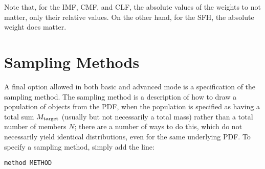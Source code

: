 \documentclass[letterpaper,10pt,english]{sphinxmanual}
\begin{document}
Note that, for the IMF, CMF, and CLF, the absolute values of the weights to not matter, only their relative values. On the other hand, for the SFH, the absolute weight does matter.


\section{Sampling Methods}
\label{pdfs:sampling-methods}\label{pdfs:sampling-metod-label}
A final option allowed in both basic and advanced mode is a specification of the sampling method. The sampling method is a description of how to draw a population of objects from the PDF, when the population is specified as having a total sum \(M_{\rm target}\) (usually but not necessarily a total mass) rather than a total number of members \(N\); there are a number of ways to do this, which do not necessarily yield identical distributions, even for the same underlying PDF. To specify a sampling method, simply add the line:

\begin{Verbatim}[commandchars=\\\{\}]
method METHOD
\end{Verbatim}
\end{document}
